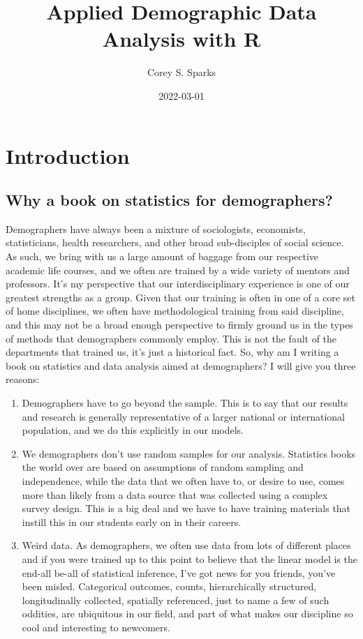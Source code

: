 \documentclass[
]{article}
\title{Applied Demographic Data Analysis with R}
\author{Corey S. Sparks}
\date{2022-03-01}
\begin{document}
\maketitle

{
\setcounter{tocdepth}{2}
\tableofcontents
}
\hypertarget{introduction}{%
\section*{Introduction}\label{introduction}}

\hypertarget{why-a-book-on-statistics-for-demographers}{%
\subsection{Why a book on statistics for demographers?}\label{why-a-book-on-statistics-for-demographers}}

Demographers have always been a mixture of sociologists, economists, statisticians, health researchers, and other broad sub-disciples of social science. As such, we bring with us a large amount of baggage from our respective academic life courses, and we often are trained by a wide variety of mentors and professors. It's my perspective that our interdisciplinary experience is one of our greatest strengths as a group. Given that our training is often in one of a core set of home disciplines, we often have methodological training from said discipline, and this may not be a broad enough perspective to firmly ground us in the types of methods that demographers commonly employ. This is not the fault of the departments that trained us, it's just a historical fact. So, why am I writing a book on statistics and data analysis aimed at demographers? I will give you three reasons:

\begin{enumerate}
\def\labelenumi{\arabic{enumi}.}
\item
  Demographers have to go beyond the sample. This is to say that our results and research is generally representative of a larger national or international population, and we do this explicitly in our models.
\item
  We demographers don't use random samples for our analysis. Statistics books the world over are based on assumptions of random sampling and independence, while the data that we often have to, or desire to use, comes more than likely from a data source that was collected using a complex survey design. This is a big deal and we have to have training materials that instill this in our students early on in their careers.
\item
  Weird data. As demographers, we often use data from lots of different places and if you were trained up to this point to believe that the linear model is the end-all be-all of statistical inference, I've got news for you friends, you've been misled. Categorical outcomes, counts, hierarchically structured, longitudinally collected, spatially referenced, just to name a few of such oddities, are ubiquitous in our field, and part of what makes our discipline so cool and interesting to newcomers.
\end{enumerate}
\end{document}
